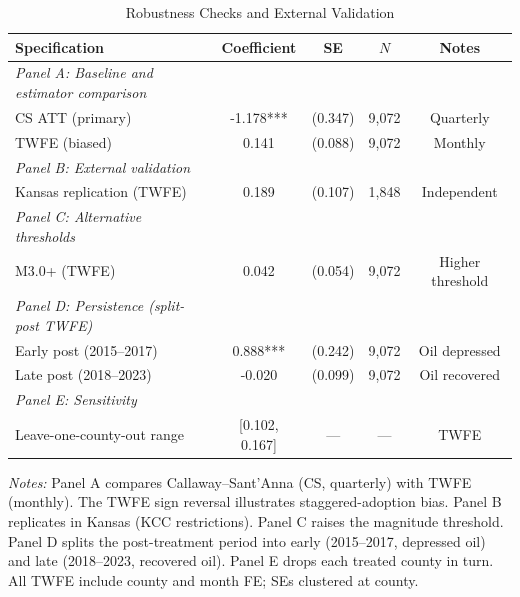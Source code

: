 \begin{table}[htbp]
\centering
\caption{Robustness Checks and External Validation}
\label{tab:robustness}
\begin{threeparttable}
\small
\begin{tabular}{lcccc}
\toprule
Specification & Coefficient & SE & $N$ & Notes \\
\midrule
\textit{Panel A: Baseline and estimator comparison} & & & & \\
\quad CS ATT (primary) & -1.178*** & (0.347) & 9,072 & Quarterly \\
\quad TWFE (biased) & 0.141 & (0.088) & 9,072 & Monthly \\
\midrule
\textit{Panel B: External validation} & & & & \\
\quad Kansas replication (TWFE) & 0.189 & (0.107) & 1,848 & Independent \\
\midrule
\textit{Panel C: Alternative thresholds} & & & & \\
\quad M3.0+ (TWFE) & 0.042 & (0.054) & 9,072 & Higher threshold \\
\midrule
\textit{Panel D: Persistence (split-post TWFE)} & & & & \\
\quad Early post (2015--2017) & 0.888*** & (0.242) & 9,072 & Oil depressed \\
\quad Late post (2018--2023) & -0.020 & (0.099) & 9,072 & Oil recovered \\
\midrule
\textit{Panel E: Sensitivity} & & & & \\
\quad Leave-one-county-out range & [0.102, 0.167] & --- & --- & TWFE \\
\bottomrule
\end{tabular}
\begin{tablenotes}[flushleft]
\footnotesize\sloppy
\item \textit{Notes:} Panel A compares Callaway--Sant'Anna (CS, quarterly) with TWFE (monthly). The TWFE sign reversal illustrates staggered-adoption bias. Panel B replicates in Kansas (KCC restrictions). Panel C raises the magnitude threshold. Panel D splits the post-treatment period into early (2015--2017, depressed oil) and late (2018--2023, recovered oil). Panel E drops each treated county in turn. All TWFE include county and month FE; SEs clustered at county.
\end{tablenotes}
\end{threeparttable}
\end{table}
